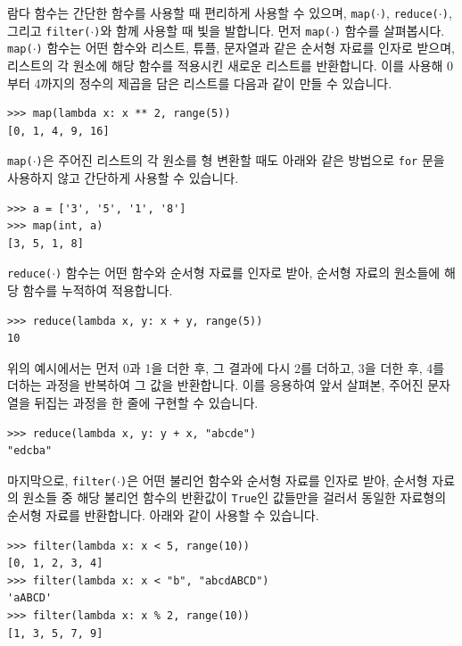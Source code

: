 \documentclass[../main.tex]{subfiles}
\begin{document}
람다 함수는 간단한 함수를 사용할 때 편리하게 사용할 수 있으며, \texttt{map($\cdot$)}, \texttt{reduce($\cdot$)}, 그리고 \texttt{filter($\cdot$)}와 함께 사용할 때 빛을 발합니다.
먼저 \texttt{map($\cdot$)} 함수를 살펴봅시다.
\texttt{map($\cdot$)} 함수는 어떤 함수와 리스트, 튜플, 문자열과 같은 순서형 자료를 인자로 받으며, 리스트의 각 원소에 해당 함수를 적용시킨 새로운 리스트를 반환합니다.
이를 사용해 0부터 4까지의 정수의 제곱을 담은 리스트를 다음과 같이 만들 수 있습니다.
\begin{verbatim}
>>> map(lambda x: x ** 2, range(5))
[0, 1, 4, 9, 16]
\end{verbatim}
\texttt{map($\cdot$)}은 주어진 리스트의 각 원소를 형 변환할 때도 아래와 같은 방법으로 \texttt{for} 문을 사용하지 않고 간단하게 사용할 수 있습니다.
\begin{verbatim}
>>> a = ['3', '5', '1', '8']
>>> map(int, a)
[3, 5, 1, 8]
\end{verbatim}

\texttt{reduce($\cdot$)} 함수는 어떤 함수와 순서형 자료를 인자로 받아, 순서형 자료의 원소들에 해당 함수를 누적하여 적용합니다.
\begin{verbatim}
>>> reduce(lambda x, y: x + y, range(5))
10
\end{verbatim}
위의 예시에서는 먼저 0과 1을 더한 후, 그 결과에 다시 2를 더하고, 3을 더한 후, 4를 더하는 과정을 반복하여 그 값을 반환합니다.
이를 응용하여 앞서 살펴본, 주어진 문자열을 뒤집는 과정을 한 줄에 구현할 수 있습니다.
\begin{verbatim}
>>> reduce(lambda x, y: y + x, "abcde")
"edcba"
\end{verbatim}

마지막으로, \texttt{filter($\cdot$)}은 어떤 불리언 함수와 순서형 자료를 인자로 받아, 순서형 자료의 원소들 중 해당 불리언 함수의 반환값이 \texttt{True}인 값들만을 걸러서 동일한 자료형의 순서형 자료를 반환합니다.
아래와 같이 사용할 수 있습니다.
\begin{verbatim}
>>> filter(lambda x: x < 5, range(10))
[0, 1, 2, 3, 4]
>>> filter(lambda x: x < "b", "abcdABCD")
'aABCD'
>>> filter(lambda x: x % 2, range(10))
[1, 3, 5, 7, 9] 
\end{verbatim}
\end{document}
